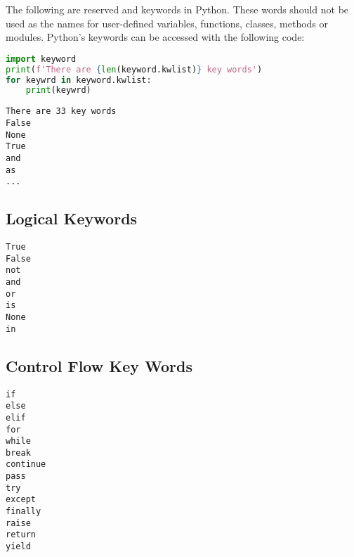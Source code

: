 \documentclass{book}
\newenvironment{key_terms}{\begin{multicols}{3}}{\end{multicols}} %
\begin{document}
    
        The following are reserved and keywords in Python. These words should
not be used as the names for user-defined variables, functions, classes,
methods or modules. Python's keywords can be accessed with the following
code:
    




    
        \begin{lstlisting}[language=Python]
import keyword
print(f'There are {len(keyword.kwlist)} key words')
for keywrd in keyword.kwlist:
    print(keywrd)
\end{lstlisting}

\begin{lstlisting}
There are 33 key words
False
None
True
and
as
...
\end{lstlisting}
    




    
        \hypertarget{logical-keywords}{%
\subsection{Logical Keywords}\label{logical-keywords}}
    




    
        \begin{key_terms}
        \begin{lstlisting}
True
False
not
and
or
is
None
in
\end{lstlisting}
        \end{key_terms}

    




    
        \hypertarget{control-flow-key-words}{%
\subsection{Control Flow Key Words}\label{control-flow-key-words}}
    




    
        \begin{key_terms}
        \begin{lstlisting}
if
else
elif
for
while
break
continue
pass
try
except
finally
raise
return
yield
\end{lstlisting}
        \end{key_terms}
\end{document}
